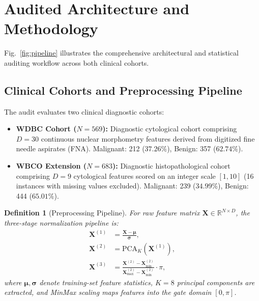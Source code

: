 \documentclass[journal,twocolumn]{IEEEtran}
\newtheorem{definition}{Definition}
\begin{document}
\section{Audited Architecture and Methodology}
\label{sec:methodology}

Fig.~\ref{fig:pipeline} illustrates the comprehensive architectural and statistical auditing workflow across both clinical cohorts.

\subsection{Clinical Cohorts and Preprocessing Pipeline}

The audit evaluates two clinical diagnostic cohorts:
\begin{itemize}
    \item \textbf{WDBC Cohort ($N=569$):} Diagnostic cytological cohort comprising $D=30$ continuous nuclear morphometry features derived from digitized fine needle aspirates (FNA). Malignant: 212 ($37.26\%$), Benign: 357 ($62.74\%$).
    \item \textbf{WBCO Extension ($N=683$):} Diagnostic histopathological cohort comprising $D=9$ cytological features scored on an integer scale $[1, 10]$ (16 instances with missing values excluded). Malignant: 239 ($34.99\%$), Benign: 444 ($65.01\%$).
\end{itemize}

\begin{definition}[Preprocessing Pipeline]
For raw feature matrix $\mathbf{X} \in \mathbb{R}^{N \times D}$, the three-stage normalization pipeline is:
\begin{align}
    \mathbf{X}^{(1)} &= \frac{\mathbf{X} - \boldsymbol{\mu}}{\boldsymbol{\sigma}}, \label{eq:standardize} \\
    \mathbf{X}^{(2)} &= \text{PCA}_K(\mathbf{X}^{(1)}), \label{eq:pca} \\
    \mathbf{X}^{(3)} &= \frac{\mathbf{X}^{(2)} - \mathbf{X}^{(2)}_{\min}}{\mathbf{X}^{(2)}_{\max} - \mathbf{X}^{(2)}_{\min}} \cdot \pi, \label{eq:minmax}
\end{align}
where $\boldsymbol{\mu}, \boldsymbol{\sigma}$ denote training-set feature statistics, $K=8$ principal components are extracted, and MinMax scaling maps features into the gate domain $[0, \pi]$.
\end{definition}
\end{document}
